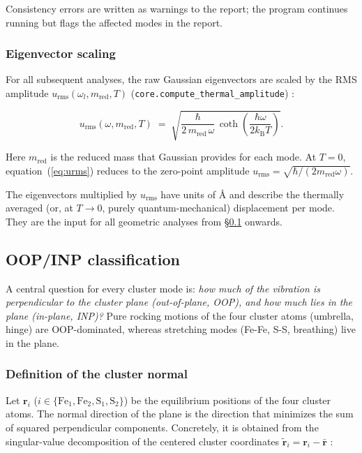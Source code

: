 \documentclass[11pt,a4paper,twoside]{article}
\newcommand{\rvec}{\mathbf{r}}
\newcommand{\kB}{k_{\mathrm{B}}}
\newcommand{\urms}{u_{\mathrm{rms}}}
\newcommand{\Fei}{\mathrm{Fe}}
\newcommand{\OOP}{\mathrm{OOP}}
\theoremstyle{remark}
\begin{document}
Consistency errors are written as warnings to the report; the
program continues running but flags the affected modes in the
report.

\subsubsection*{Eigenvector scaling}

For all subsequent analyses, the raw Gaussian eigenvectors are
scaled by the RMS amplitude
$\urms(\omega_l, m_{\mathrm{red}}, T)$
(\texttt{core.compute\_thermal\_amplitude})
\cite{Achterhold2002,WilsonDeciusCross1955}:

\begin{equation}
  \urms(\omega, m_{\mathrm{red}}, T) \;=\;
  \sqrt{\frac{\hbar}{2\,m_{\mathrm{red}}\,\omega} \,
        \coth\!\left(\frac{\hbar\omega}{2\kB T}\right)} .
  \label{eq:urms}
\end{equation}

Here $m_{\mathrm{red}}$ is the reduced mass that Gaussian provides
for each mode. At $T=0$, equation~(\ref{eq:urms}) reduces to the
zero-point amplitude
$\urms = \sqrt{\hbar / (2 m_{\mathrm{red}} \omega)}$.

The eigenvectors multiplied by $\urms$ have units of \AA{} and
describe the thermally averaged (or, at $T \to 0$, purely
quantum-mechanical) displacement per mode. They are the input for
all geometric analyses from \S\ref{sec:oop-inp} onwards.

\subsection{OOP/INP classification}
\label{sec:oop-inp}

A central question for every cluster mode is: \emph{how much of the
vibration is perpendicular to the cluster plane (out-of-plane, OOP),
and how much lies in the plane (in-plane, INP)?}
Pure rocking motions of the four cluster atoms (umbrella, hinge) are
$\OOP$-dominated, whereas stretching modes (Fe-Fe, S-S, breathing)
live in the plane.

\subsubsection*{Definition of the cluster normal}

Let $\rvec_i$ ($i \in \{\Fei_1, \Fei_2, \mathrm{S}_1, \mathrm{S}_2\}$)
be the equilibrium positions of the four cluster atoms. The normal
direction of the plane is the direction that minimizes the sum of
squared perpendicular components. Concretely, it is obtained from
the singular-value decomposition of the centered cluster coordinates
$\tilde{\rvec}_i = \rvec_i - \bar{\rvec}$ \cite{Kabsch1976}:
\end{document}
